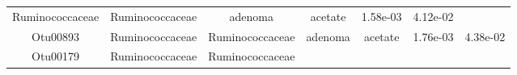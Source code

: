 \documentclass[11pt,]{article}
\begin{document}
\begin{longtable}[]{@{}ccccccc@{}}
\begin{minipage}[t]{0.17\columnwidth}
Ruminococcaceae\strut
\end{minipage} & \begin{minipage}[t]{0.17\columnwidth}\centering\strut
Ruminococcaceae\strut
\end{minipage} & \begin{minipage}[t]{0.09\columnwidth}\centering\strut
adenoma\strut
\end{minipage} & \begin{minipage}[t]{0.11\columnwidth}\centering\strut
acetate\strut
\end{minipage} & \begin{minipage}[t]{0.09\columnwidth}\centering\strut
1.58e-03\strut
\end{minipage} & \begin{minipage}[t]{0.09\columnwidth}\centering\strut
4.12e-02\strut
\end{minipage}\tabularnewline
\begin{minipage}[t]{0.09\columnwidth}\centering\strut
Otu00893\strut
\end{minipage} & \begin{minipage}[t]{0.17\columnwidth}\centering\strut
Ruminococcaceae\strut
\end{minipage} & \begin{minipage}[t]{0.17\columnwidth}\centering\strut
Ruminococcaceae\strut
\end{minipage} & \begin{minipage}[t]{0.09\columnwidth}\centering\strut
adenoma\strut
\end{minipage} & \begin{minipage}[t]{0.11\columnwidth}\centering\strut
acetate\strut
\end{minipage} & \begin{minipage}[t]{0.09\columnwidth}\centering\strut
1.76e-03\strut
\end{minipage} & \begin{minipage}[t]{0.09\columnwidth}\centering\strut
4.38e-02\strut
\end{minipage}\tabularnewline
\begin{minipage}[t]{0.09\columnwidth}\centering\strut
Otu00179\strut
\end{minipage} & \begin{minipage}[t]{0.17\columnwidth}\centering\strut
Ruminococcaceae\strut
\end{minipage} & \begin{minipage}[t]{0.17\columnwidth}\centering\strut
Ruminococcaceae\strut
\end{minipage} & \begin{minipage}[t]{0.09\columnwidth}\centering\strut

\end{minipage}
\end{longtable}
\end{document}
